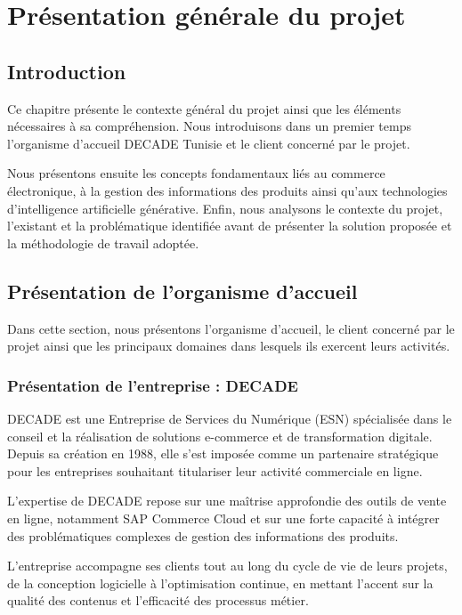 ﻿\chapter{Présentation générale du projet}
\label{chap:premierchapitre}
\section{Introduction}

Ce chapitre présente le contexte général du projet ainsi que les éléments nécessaires à sa compréhension. Nous introduisons dans un premier temps l'organisme d'accueil DECADE Tunisie et le client concerné par le projet.

Nous présentons ensuite les concepts fondamentaux liés au commerce électronique, à la gestion des informations des produits ainsi qu'aux technologies d'intelligence artificielle générative. Enfin, nous analysons le contexte du projet, l'existant et la problématique identifiée avant de présenter la solution proposée et la méthodologie de travail adoptée.
\section{Présentation de l’organisme d’accueil}

Dans cette section, nous présentons l'organisme d'accueil, le client concerné par le projet ainsi que les principaux domaines dans lesquels ils exercent leurs activités.

\subsection{Présentation de l’entreprise : DECADE}

DECADE  est une Entreprise de Services du Numérique (ESN) spécialisée dans le conseil et la réalisation de solutions e-commerce et de transformation digitale. Depuis sa création en 1988, elle s’est imposée comme un partenaire stratégique pour les entreprises souhaitant titulariser leur activité commerciale en ligne.

L’expertise de DECADE repose sur une maîtrise approfondie des outils de vente en ligne, notamment SAP Commerce Cloud et sur une forte capacité à intégrer des problématiques complexes de gestion des informations des produits. 
\newpage

L'entreprise accompagne ses clients tout au long du cycle de vie de leurs projets, de la conception logicielle à l'optimisation continue, en mettant l'accent sur la qualité des contenus et l'efficacité des processus métier.

